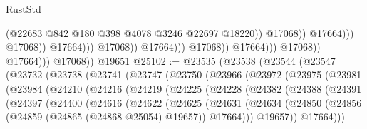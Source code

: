 \begin{lexlean}{RustStd}
\begin{coremodule}
                                                            (@22683
                                                              @842
                                                              @180
                                                              @398
                                                              @4078
                                                              @3246
                                                              @22697
                                                              @18220))
                                                          @17068))
                                                      @17664)))
                                                @17068))
                                            @17664)))
                                      @17068))
                                  @17664)))
                            @17068))
                        @17664)))
                  @17068))
              @17664)))
        @17068))
    @19651
@25102 := @23535
    (@23538
      (@23544
        (@23547
          (@23732
            (@23738
              (@23741
                (@23747
                  (@23750
                    (@23966
                      (@23972
                        (@23975
                          (@23981
                            (@23984
                              (@24210
                                (@24216
                                  (@24219
                                    (@24225
                                      (@24228
                                        (@24382
                                          (@24388
                                            (@24391
                                              (@24397
                                                (@24400
                                                  (@24616
                                                    (@24622
                                                      (@24625
                                                        (@24631
                                                          (@24634
                                                            (@24850
                                                              (@24856
                                                                (@24859
                                                                  (@24865 (@24868 @25054) @19657))
                                                                @17664)))
                                                          @19657))
                                                      @17664)))

\end{coremodule}
\end{lexlean}
